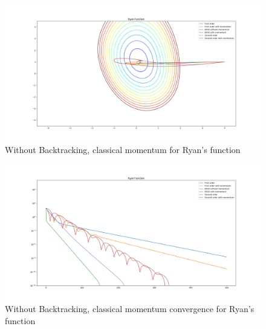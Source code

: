 \documentclass{article}
\begin{document}
\begin{center}
\begin{figure}[H]
	\includegraphics[width=\linewidth]{../Images/ryanmomentum.png}
	\caption{Without Backtracking, classical momentum for Ryan's function}
	\label{fig:Without Backtracking, classical momentum for Ryan's function}
\end{figure}

\begin{figure}[H]
	\includegraphics[width=\linewidth]{../Images/ryanmomentum1.png}
	\caption{Without Backtracking, classical momentum convergence for Ryan's function}
	\label{fig:Without Backtracking, classical momentum convergence for Ryan's function}
\end{figure}


\end{center}
\end{document}
